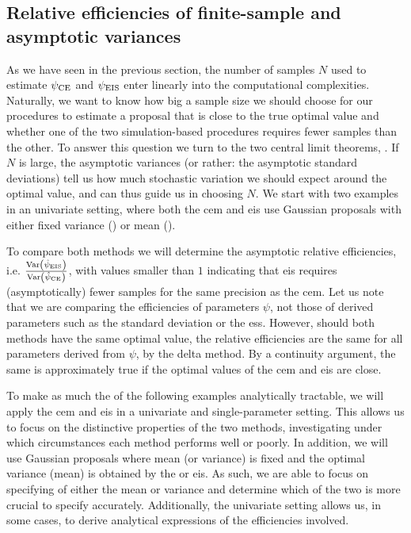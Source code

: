 \subsection{Relative efficiencies of finite-sample and asymptotic variances}
As we have seen in the previous section, the number of samples $N$ used to estimate ${\psi_{\text{CE}}}$ and ${\psi_{\text{EIS}}}$ enter linearly into the computational complexities. Naturally, we want to know how big a sample size we should choose for our procedures to estimate a proposal that is close to the true optimal value and whether one of the two simulation-based procedures requires fewer samples than the other. To answer this question we turn to the two central limit theorems, . If $N$ is large, the asymptotic variances (or rather: the asymptotic standard deviations) tell us how much stochastic variation we should expect around the optimal value, and can thus guide us in choosing $N$. 
We start with two examples in an univariate setting, where both the \gls{cem} and \gls{eis} use Gaussian proposals with either fixed variance () or mean ().

To compare both methods we will determine the asymptotic relative efficiencies, i.e. $ \frac{\operatorname{Var} \left( {\hat\psi_{\text{EIS}}} \right)}{\operatorname{Var} \left( {\hat\psi_{\text{CE}}} \right)}$, with values smaller than $1$ indicating that \gls{eis} requires (asymptotically) fewer samples for the same precision as the \gls{cem}.
Let us note that we are comparing the efficiencies of parameters $\psi$, not those of derived parameters such as the standard deviation or the \gls{ess}. However, should both methods have the same optimal value, the relative efficiencies are the same for all parameters derived from $\psi$, by the delta method. By a continuity argument, the same is approximately true if the optimal values of the \gls{cem} and \gls{eis} are close.

To make as much the of the following examples analytically tractable, we will apply the \acrshort{cem} and \acrshort{eis} in a univariate and single-parameter setting. This allows us to focus on the distinctive properties of the two methods, investigating under which circumstances each method performs well or poorly. In addition, we will use Gaussian proposals where mean (or variance) is fixed and the optimal variance (mean) is obtained by the  or \acrshort{eis}.
As such, we are able to focus on specifying of either the mean or variance and determine which of the two is more crucial to specify accurately. Additionally, the univariate setting allows us, in some cases, to derive analytical expressions of the efficiencies involved.

